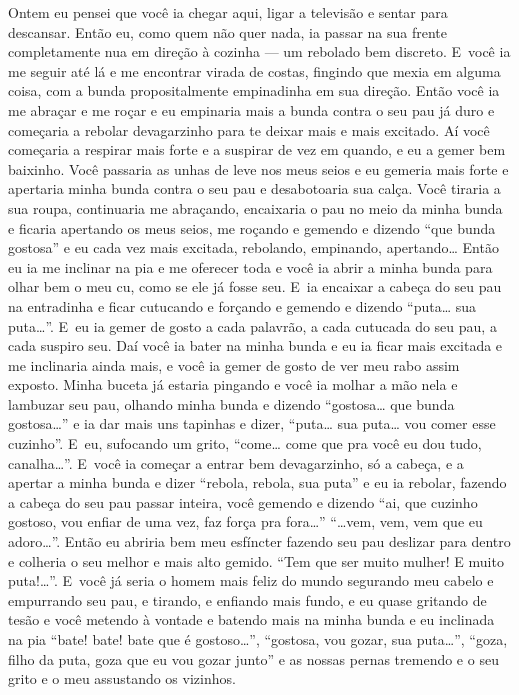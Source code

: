 Ontem eu pensei que você ia chegar aqui, ligar a televisão e sentar para
descansar. Então eu, como quem não quer nada, ia passar na sua frente
completamente nua em direção à cozinha --- um rebolado bem discreto. E~você ia me seguir até lá e me encontrar virada de costas, fingindo que
mexia em alguma coisa, com a bunda propositalmente empinadinha em sua
direção. Então você ia me abraçar e me roçar e eu empinaria mais a bunda
contra o seu pau já duro e começaria a rebolar devagarzinho para te
deixar mais e mais excitado. Aí você começaria a respirar mais forte e a
suspirar de vez em quando, e eu a gemer bem baixinho. Você passaria as
unhas de leve nos meus seios e eu gemeria mais forte e apertaria minha
bunda contra o seu pau e desabotoaria sua calça. Você tiraria a sua
roupa, continuaria me abraçando, encaixaria o pau no meio da minha bunda
e ficaria apertando os meus seios, me roçando e gemendo e dizendo ``que
bunda gostosa'' e eu cada vez mais excitada, rebolando, empinando,
apertando… Então eu ia me inclinar na pia e me oferecer toda e
você ia abrir a minha bunda para olhar bem o meu cu, como se ele já
fosse seu. E~ia encaixar a cabeça do seu pau na entradinha e ficar
cutucando e forçando e gemendo e dizendo ``puta… sua
puta…''. E~eu ia gemer de gosto a cada palavrão, a cada cutucada
do seu pau, a cada suspiro seu. Daí você ia bater na minha bunda e eu ia
ficar mais excitada e me inclinaria ainda mais, e você ia gemer de gosto
de ver meu rabo assim exposto. Minha buceta já estaria pingando e você
ia molhar a mão nela e lambuzar seu pau, olhando minha bunda e dizendo
``gostosa… que bunda gostosa…'' e ia dar mais uns tapinhas
e dizer, ``puta… sua puta… vou comer esse cuzinho''. E~eu,
sufocando um grito, ``come… come que pra você eu dou tudo,
canalha…''. E~você ia começar a entrar bem devagarzinho, só a
cabeça, e a apertar a minha bunda e dizer ``rebola, rebola, sua puta'' e
eu ia rebolar, fazendo a cabeça do seu pau passar inteira, você gemendo
e dizendo ``ai, que cuzinho gostoso, vou enfiar de uma vez, faz força
pra fora…'' ``…vem, vem, vem que eu adoro…''. Então
eu abriria bem meu esfíncter fazendo seu pau deslizar para dentro e
colheria o seu melhor e mais alto gemido. ``Tem que ser muito mulher! E
muito puta!…''. E~você já seria o homem mais feliz do mundo
segurando meu cabelo e empurrando seu pau, e tirando, e enfiando mais
fundo, e eu quase gritando de tesão e você metendo à vontade e batendo
mais na minha bunda e eu inclinada na pia ``bate! bate! bate que é
gostoso…'', ``gostosa, vou gozar, sua puta…'', ``goza, filho
da puta, goza que eu vou gozar junto'' e as nossas pernas tremendo e o
seu grito e o meu assustando os vizinhos.

